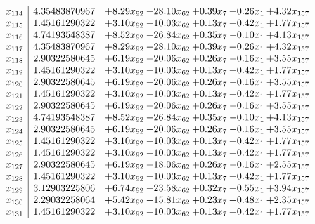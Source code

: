 \documentclass[8pt]{article}
\begin{document}
\[\begin{array}{c| c c@{\hskip 2pt} c@{\hskip 2pt} c@{\hskip 2pt} c@{\hskip 2pt} c@{\hskip 2pt} }
 x_{114}   &  4.35483870967 & +  8.29 x_{92} & -28.10 x_{62} & +  0.39 x_{7} & +  0.26 x_{1} & +  4.32 x_{157}\\
 x_{115}   &  1.45161290322 & +  3.10 x_{92} & -10.03 x_{62} & +  0.13 x_{7} & +  0.42 x_{1} & +  1.77 x_{157}\\
 x_{116}   &  4.74193548387 & +  8.52 x_{92} & -26.84 x_{62} & +  0.35 x_{7} & -0.10 x_{1} & +  4.13 x_{157}\\
 x_{117}   &  4.35483870967 & +  8.29 x_{92} & -28.10 x_{62} & +  0.39 x_{7} & +  0.26 x_{1} & +  4.32 x_{157}\\
 x_{118}   &  2.90322580645 & +  6.19 x_{92} & -20.06 x_{62} & +  0.26 x_{7} & -0.16 x_{1} & +  3.55 x_{157}\\
 x_{119}   &  1.45161290322 & +  3.10 x_{92} & -10.03 x_{62} & +  0.13 x_{7} & +  0.42 x_{1} & +  1.77 x_{157}\\
 x_{120}   &  2.90322580645 & +  6.19 x_{92} & -20.06 x_{62} & +  0.26 x_{7} & -0.16 x_{1} & +  3.55 x_{157}\\
 x_{121}   &  1.45161290322 & +  3.10 x_{92} & -10.03 x_{62} & +  0.13 x_{7} & +  0.42 x_{1} & +  1.77 x_{157}\\
 x_{122}   &  2.90322580645 & +  6.19 x_{92} & -20.06 x_{62} & +  0.26 x_{7} & -0.16 x_{1} & +  3.55 x_{157}\\
 x_{123}   &  4.74193548387 & +  8.52 x_{92} & -26.84 x_{62} & +  0.35 x_{7} & -0.10 x_{1} & +  4.13 x_{157}\\
 x_{124}   &  2.90322580645 & +  6.19 x_{92} & -20.06 x_{62} & +  0.26 x_{7} & -0.16 x_{1} & +  3.55 x_{157}\\
 x_{125}   &  1.45161290322 & +  3.10 x_{92} & -10.03 x_{62} & +  0.13 x_{7} & +  0.42 x_{1} & +  1.77 x_{157}\\
 x_{126}   &  1.45161290322 & +  3.10 x_{92} & -10.03 x_{62} & +  0.13 x_{7} & +  0.42 x_{1} & +  1.77 x_{157}\\
 x_{127}   &  2.90322580645 & +  6.19 x_{92} & -18.06 x_{62} & +  0.26 x_{7} & -0.16 x_{1} & +  2.55 x_{157}\\
 x_{128}   &  1.45161290322 & +  3.10 x_{92} & -10.03 x_{62} & +  0.13 x_{7} & +  0.42 x_{1} & +  1.77 x_{157}\\
 x_{129}   &  3.12903225806 & +  6.74 x_{92} & -23.58 x_{62} & +  0.32 x_{7} & +  0.55 x_{1} & +  3.94 x_{157}\\
 x_{130}   &  2.29032258064 & +  5.42 x_{92} & -15.81 x_{62} & +  0.23 x_{7} & +  0.48 x_{1} & +  2.35 x_{157}\\
 x_{131}   &  1.45161290322 & +  3.10 x_{92} & -10.03 x_{62} & +  0.13 x_{7} & +  0.42 x_{1} & +  1.77 x_{157}\\

\end{array}\]
\end{document}
